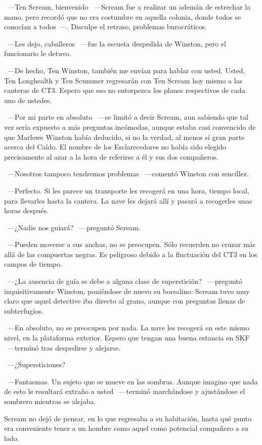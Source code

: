 ~---Ten Scream, bienvenido ~---Scream fue a realizar un ademán de estrechar la mano, pero recordó que no era costumbre en aquella colonia, donde todos se conocían a todos~---. Disculpe el retraso, problemas burocráticos.

~---Les dejo, caballeros ~---fue la escueta despedida de Winston, pero el funcionario le detuvo.

~---De hecho, Ten Winston, también me envían para hablar con usted. Usted, Ten Longhealth y Ten Scummer regresarán con Ten Scream hoy mismo a las canteras de CT3. Espero que eso no entorpezca los planes respectivos de cada uno de ustedes.

~---Por mi parte en absoluto ~---se limitó a decir Scream, aun sabiendo que tal vez sería expuesto a más preguntas incómodas, aunque estaba casi convencido de que Marlowe Winston había deducido, si no la verdad, al menos sí gran parte acerca del Caído. El nombre de los Esclarecedores no había sido elegido precisamente al azar a la hora de referirse a él y sus dos compañeros.

~---Nosotros tampoco tendremos problemas ~---comentó Winston con sencillez.

~---Perfecto. Si les parece un transporte les recogerá en una hora, tiempo local, para llevarles hasta la cantera. La nave les dejará allí y pasará a recogerles unas horas después.

~---¿Nadie nos guiará? ~---preguntó Scream.

~---Pueden moverse a sus anchas, no se preocupen. Sólo recuerden no cruzar más allá de las compuertas negras. Es peligroso debido a la fluctuación del CT3 en los campos de tiempo.

~---¿La ausencia de guía se debe a alguna clase de superstición? ~---preguntó inquisitivamente Winston, poniéndose de nuevo su borsalino. Scream tuvo muy claro que aquel detective iba directo al grano, aunque con preguntas llenas de subterfugios.

~---En absoluto, no se preocupen por nada. La nave les recogerá en este mismo nivel, en la plataforma exterior. Espero que tengan una buena estancia en SKF ~---terminó tras despedirse y alejarse.

~---¿Supersticiones?

~---Fantasmas. Un sujeto que se mueve en las sombras. Aunque imagino que nada de esto le resultará extraño a usted ~---terminó marchándose y ajustándose el sombrero mientras se alejaba.

Scream no dejó de pensar, en lo que regresaba a su habitación, hasta qué punto era conveniente tener a un hombre como aquel como potencial compañero a su lado.

